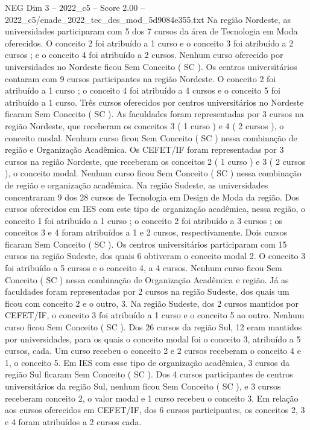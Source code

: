 \begin{textsample}{NEG Dim 3 – 2022\_c5 – Score 2.00 – 2022\_c5/enade\_2022\_tec\_des\_mod\_5d9084e355.txt}
Na região Nordeste, as universidades participaram com 5 dos 7 cursos da área de Tecnologia em Moda oferecidos.
O conceito 2 foi atribuído a 1 curso e o conceito 3 foi atribuído a 2 cursos ; e o conceito 4 foi atribuído a 2 cursos.
Nenhum curso oferecido por universidades no Nordeste ficou Sem Conceito ( SC ).
Os centros universitários contaram com 9 cursos participantes na região Nordeste.
O conceito 2 foi atribuído a 1 curso ; o conceito 4 foi atribuído a 4 cursos e o conceito 5 foi atribuído a 1 curso.
Três cursos oferecidos por centros universitários no Nordeste ficaram Sem Conceito ( SC ).
As faculdades foram representadas por 3 cursos na região Nordeste, que receberam os conceitos 3 ( 1 curso ) e 4 ( 2 cursos ), o conceito modal.
Nenhum curso ficou Sem Conceito ( SC ) nessa combinação de região e Organização Acadêmica.
Os CEFET/IF foram representadas por 3 cursos na região Nordeste, que receberam os conceitos 2 ( 1 curso ) e 3 ( 2 cursos ), o conceito modal.
Nenhum curso ficou Sem Conceito ( SC ) nessa combinação de região e organização acadêmica.
Na região Sudeste, as universidades concentraram 9 dos 28 cursos de Tecnologia em Design de Moda da região.
Dos cursos oferecidos em IES com este tipo de organização acadêmica, nessa região, o conceito 1 foi atribuído a 1 curso ; o conceito 2 foi atribuído a 3 cursos ; os conceitos 3 e 4 foram atribuídos a 1 e 2 cursos, respectivamente.
Dois cursos ficaram Sem Conceito ( SC ).
Os centros universitários participaram com 15 cursos na região Sudeste, dos quais 6 obtiveram o conceito modal 2.
O conceito 3 foi atribuído a 5 cursos e o conceito 4, a 4 cursos.
Nenhum curso ficou Sem Conceito ( SC ) nessa combinação de Organização Acadêmica e região.
Já as faculdades foram representadas por 2 cursos na região Sudeste, dos quais um ficou com conceito 2 e o outro, 3.
Na região Sudeste, dos 2 cursos mantidos por CEFET/IF, o conceito 3 foi atribuído a 1 curso e o conceito 5 ao outro.
Nenhum curso ficou Sem Conceito ( SC ).
Dos 26 cursos da região Sul, 12 eram mantidos por universidades, para os quais o conceito modal foi o conceito 3, atribuído a 5 cursos, cada.
Um curso recebeu o conceito 2 e 2 cursos receberam o conceito 4 e 1, o conceito 5.
Em IES com esse tipo de organização acadêmica, 3 cursos da região Sul ficaram Sem Conceito ( SC ).
Dos 4 cursos participantes de centros universitários da região Sul, nenhum ficou Sem Conceito ( SC ), e 3 cursos receberam conceito 2, o valor modal e 1 curso recebeu o conceito 3.
Em relação aos cursos oferecidos em CEFET/IF, dos 6 cursos participantes, os conceitos 2, 3 e 4 foram atribuídos a 2 cursos cada.

\end{textsample}
